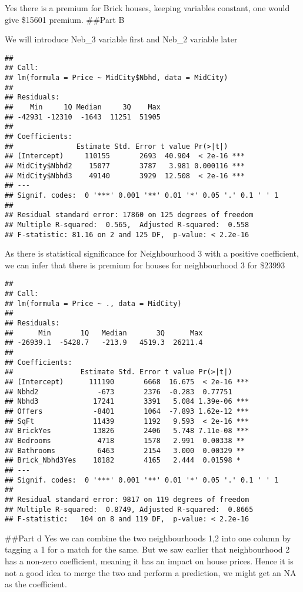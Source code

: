 \documentclass[
]{article}
\begin{document}
Yes there is a premium for Brick houses, keeping variables constant, one
would give \$15601 premium. \#\#Part B

We will introduce Neb\_3 variable first and Neb\_2 variable later

\begin{verbatim}
## 
## Call:
## lm(formula = Price ~ MidCity$Nbhd, data = MidCity)
## 
## Residuals:
##    Min     1Q Median     3Q    Max 
## -42931 -12310  -1643  11251  51905 
## 
## Coefficients:
##               Estimate Std. Error t value Pr(>|t|)    
## (Intercept)     110155       2693  40.904  < 2e-16 ***
## MidCity$Nbhd2    15077       3787   3.981 0.000116 ***
## MidCity$Nbhd3    49140       3929  12.508  < 2e-16 ***
## ---
## Signif. codes:  0 '***' 0.001 '**' 0.01 '*' 0.05 '.' 0.1 ' ' 1
## 
## Residual standard error: 17860 on 125 degrees of freedom
## Multiple R-squared:  0.565,  Adjusted R-squared:  0.558 
## F-statistic: 81.16 on 2 and 125 DF,  p-value: < 2.2e-16
\end{verbatim}

As there is statistical significance for Neighbourhood 3 with a positive
coefficient, we can infer that there is premium for houses for
neighbourhood 3 for \$23993

\begin{verbatim}
## 
## Call:
## lm(formula = Price ~ ., data = MidCity)
## 
## Residuals:
##      Min       1Q   Median       3Q      Max 
## -26939.1  -5428.7   -213.9   4519.3  26211.4 
## 
## Coefficients:
##                Estimate Std. Error t value Pr(>|t|)    
## (Intercept)      111190       6668  16.675  < 2e-16 ***
## Nbhd2              -673       2376  -0.283  0.77751    
## Nbhd3             17241       3391   5.084 1.39e-06 ***
## Offers            -8401       1064  -7.893 1.62e-12 ***
## SqFt              11439       1192   9.593  < 2e-16 ***
## BrickYes          13826       2406   5.748 7.11e-08 ***
## Bedrooms           4718       1578   2.991  0.00338 ** 
## Bathrooms          6463       2154   3.000  0.00329 ** 
## Brick_Nbhd3Yes    10182       4165   2.444  0.01598 *  
## ---
## Signif. codes:  0 '***' 0.001 '**' 0.01 '*' 0.05 '.' 0.1 ' ' 1
## 
## Residual standard error: 9817 on 119 degrees of freedom
## Multiple R-squared:  0.8749, Adjusted R-squared:  0.8665 
## F-statistic:   104 on 8 and 119 DF,  p-value: < 2.2e-16
\end{verbatim}

\#\#Part d Yes we can combine the two neighbourhoods 1,2 into one column
by tagging a 1 for a match for the same. But we saw earlier that
neighbourhood 2 has a non-zero coefficient, meaning it has an impact on
house prices. Hence it is not a good idea to merge the two and perform a
prediction, we might get an NA as the coefficient.
\end{document}
